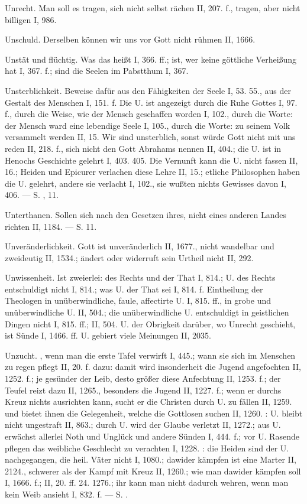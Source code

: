 Unrecht. Man soll es tragen, sich nicht selbst rächen II, 207. f., tragen, aber nicht billigen I, 986.

Unschuld. Derselben können wir uns vor Gott nicht rühmen II, 1666.

Unstät und flüchtig. Was das heißt I, 366. ff.; ist, wer keine göttliche Verheißung hat I, 367. f.; sind die Seelen im Pabstthum I, 367.

Unsterblichkeit. Beweise dafür aus den Fähigkeiten der Seele I, 53. 55., aus der Gestalt des Menschen I, 151. f. Die U. ist angezeigt durch die Ruhe Gottes I, 97. f., durch die Weise, wie der Mensch geschaffen worden I, 102., durch die Worte: der Mensch ward eine lebendige Seele I, 105., durch die Worte: zu seinem Volk versammelt werden II, 15. Wir sind unsterblich, sonst würde Gott nicht mit uns reden II, 218. f., sich nicht den Gott Abrahams nennen II, 404.; die U. ist in Henochs Geschichte gelehrt I, 403. 405. Die Vernunft kann die U. nicht fassen II, 16.; Heiden und Epicurer verlachen diese Lehre II, 15.; etliche Philosophen haben die U. gelehrt, andere sie verlacht I, 102., sie wußten nichts Gewisses davon I, 406. — S. ,  11.

Unterthanen. Sollen sich nach den Gesetzen ihres, nicht eines anderen Landes richten II, 1184. — S.  11.

Unveränderlichkeit. Gott ist unveränderlich II, 1677., nicht wandelbar und zweideutig II, 1534.; ändert oder widerruft sein Urtheil nicht II, 292.

Unwissenheit. Ist zweierlei: des Rechts und der That I, 814.; U. des Rechts entschuldigt nicht I, 814.; was U. der That sei I, 814. f. Eintheilung der Theologen in unüberwindliche, faule, affectirte U. I, 815. ff., in grobe und unüberwindliche U. II, 504.; die unüberwindliche U. entschuldigt in geistlichen Dingen nicht I, 815. ff.; II, 504. U. der Obrigkeit darüber, wo Unrecht geschieht, ist Sünde I, 1466. ff. U. gebiert viele Meinungen II, 2035.

Unzucht. , wenn man die erste Tafel verwirft I, 445.; wann sie sich im Menschen zu regen pflegt II, 20. f.  dazu: damit wird insonderheit die Jugend angefochten II, 1252. f.; je gesünder der Leib, desto größer diese Anfechtung II, 1253. f.; der Teufel reizt
dazu II, 1265., besonders die Jugend II, 1227. f.; wenn er durchs Kreuz nichts ausrichten kann, sucht er die Christen durch U. zu fällen II, 1259. und bietet ihnen die Gelegenheit, welche die Gottlosen suchen II, 1260. : U. bleibt nicht ungestraft II, 863.; durch U. wird der Glaube verletzt II, 1272.; aus U. erwächst allerlei Noth und Unglück und andere Sünden I, 444. f.; vor U. Rasende pflegen das weibliche Geschlecht zu verachten I, 1228. : die Heiden sind der U. nachgegangen, die heil. Väter nicht I, 1080.; dawider kämpfen ist eine Marter II, 2124., schwerer als der Kampf mit Kreuz II, 1260.; wie man dawider kämpfen soll I, 1666. f.; II, 20. ff. 24. 1276.; ihr kann man nicht dadurch wehren, wenn man kein Weib ansieht I, 832. f. — S. .

